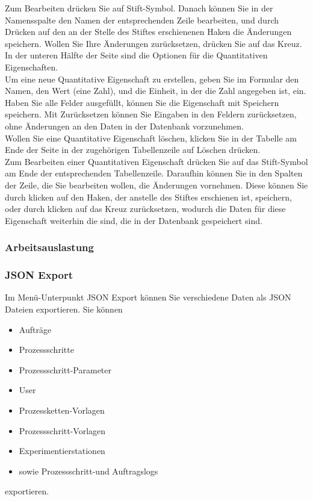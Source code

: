 \documentclass[enabledeprecatedfontcommands,fontsize=12pt,paper=a4,twoside]{scrartcl}
\begin{document}
Zum Bearbeiten drücken Sie auf Stift-Symbol. Danach können Sie in der Namensspalte den Namen der entsprechenden Zeile bearbeiten, und durch Drücken auf den an der Stelle des Stiftes erschienenen Haken die Änderungen speichern. Wollen Sie Ihre Änderungen zurücksetzen, drücken Sie auf das Kreuz. \\

In der unteren Hälfte der Seite sind die Optionen für die Quantitativen Eigenschaften. \\

Um eine neue Quantitative Eigenschaft zu erstellen, geben Sie im Formular den Namen, den Wert (eine Zahl), und die Einheit, in der die Zahl angegeben ist, ein. Haben Sie alle Felder ausgefüllt, können Sie die Eigenschaft mit Speichern speichern. Mit Zurücksetzen können Sie Eingaben in den Feldern zurücksetzen, ohne Änderungen an den Daten in der Datenbank vorzunehmen. \\

Wollen Sie eine Quantitative Eigenschaft löschen, klicken Sie in der Tabelle am Ende der Seite in der zugehörigen Tabellenzeile auf Löschen drücken. \\

Zum Bearbeiten einer Quantitativen Eigenschaft drücken Sie auf das Stift-Symbol am Ende der entsprechenden Tabellenzeile. Daraufhin können Sie in den Spalten der Zeile, die Sie bearbeiten wollen, die Änderungen vornehmen. Diese können Sie durch klicken auf den Haken, der anstelle des Stiftes erschienen ist, speichern, oder durch klicken auf das Kreuz zurücksetzen, wodurch die Daten für diese Eigenschaft weiterhin die sind, die in der Datenbank gespeichert sind. \\
\subsubsection{Arbeitsauslastung}
\subsubsection{JSON Export}

Im Menü-Unterpunkt JSON Export können Sie verschiedene Daten als JSON Dateien exportieren. Sie können 
\begin{itemize}
\item Aufträge
\item Prozessschritte
\item Prozessschritt-Parameter
\item User
\item Prozessketten-Vorlagen
\item Prozessschritt-Vorlagen
\item Experimentierstationen
\item sowie Prozessschritt-und Auftragslogs 
\end{itemize}
exportieren. \\
\end{document}
